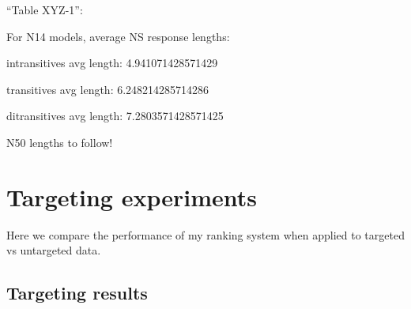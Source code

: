 ``Table XYZ-1'':

For N14 models, average NS response lengths:

intransitives avg length: 4.941071428571429

transitives avg length: 6.248214285714286

ditransitives avg length: 7.2803571428571425

N50 lengths to follow! 

\section{Targeting experiments}
\label{sec:exp-targeting}
Here we compare the performance of my ranking system when applied to targeted vs untargeted data.
\subsection{Targeting results}
\label{sec:targeting-results}

